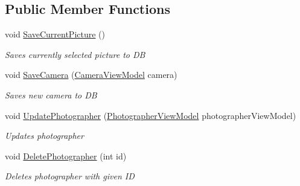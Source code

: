 \subsection*{Public Member Functions}
\begin{DoxyCompactItemize}
\item 
void \mbox{\hyperlink{class_pic_d_b_1_1_view_models_1_1_main_window_view_model_aec5f805a75b05d57d6c8a057a874519e}{Save\+Current\+Picture}} ()
\begin{DoxyCompactList}\small\item\em Saves currently selected picture to DB \end{DoxyCompactList}\item 
void \mbox{\hyperlink{class_pic_d_b_1_1_view_models_1_1_main_window_view_model_ada19d2955e0f0bfc31920483a53f4850}{Save\+Camera}} (\mbox{\hyperlink{class_pic_d_b_1_1_view_models_1_1_camera_view_model}{Camera\+View\+Model}} camera)
\begin{DoxyCompactList}\small\item\em Saves new camera to DB \end{DoxyCompactList}\item 
void \mbox{\hyperlink{class_pic_d_b_1_1_view_models_1_1_main_window_view_model_a122865147968287045a9390940c1582c}{Update\+Photographer}} (\mbox{\hyperlink{class_pic_d_b_1_1_view_models_1_1_photographer_view_model}{Photographer\+View\+Model}} photographer\+View\+Model)
\begin{DoxyCompactList}\small\item\em Updates photographer \end{DoxyCompactList}\item 
void \mbox{\hyperlink{class_pic_d_b_1_1_view_models_1_1_main_window_view_model_a26618fe0f1e947caf7ab7f4ca94941f2}{Delete\+Photographer}} (int id)
\begin{DoxyCompactList}\small\item\em Deletes photographer with given ID \end{DoxyCompactList}\end{DoxyCompactItemize}
